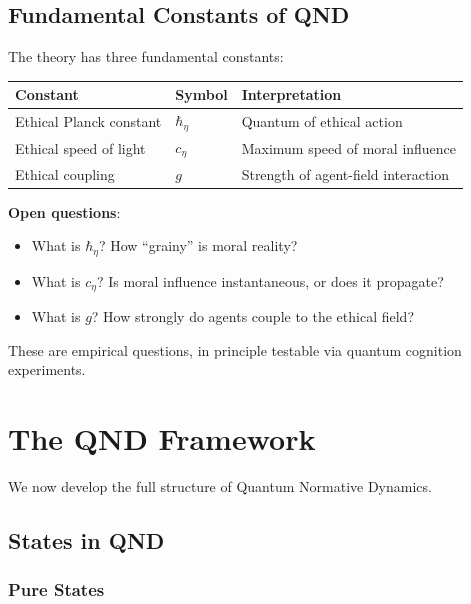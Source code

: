 \documentclass[12pt]{article}
\begin{document}
\subsection{Fundamental Constants of QND}

The theory has three fundamental constants:

\begin{table}[h]
\centering
\begin{tabular}{lll}
\toprule
\textbf{Constant} & \textbf{Symbol} & \textbf{Interpretation} \\
\midrule
Ethical Planck constant & $\hbar_\eta$ & Quantum of ethical action \\
Ethical speed of light & $c_\eta$ & Maximum speed of moral influence \\
Ethical coupling & $g$ & Strength of agent-field interaction \\
\bottomrule
\end{tabular}
\end{table}

\textbf{Open questions}:

\begin{itemize}
    \item What is $\hbar_\eta$? How ``grainy'' is moral reality?
    \item What is $c_\eta$? Is moral influence instantaneous, or does it propagate?
    \item What is $g$? How strongly do agents couple to the ethical field?
\end{itemize}

These are empirical questions, in principle testable via quantum cognition experiments.

\section{The QND Framework}

We now develop the full structure of Quantum Normative Dynamics.

\subsection{States in QND}

\subsubsection{Pure States}
\end{document}
